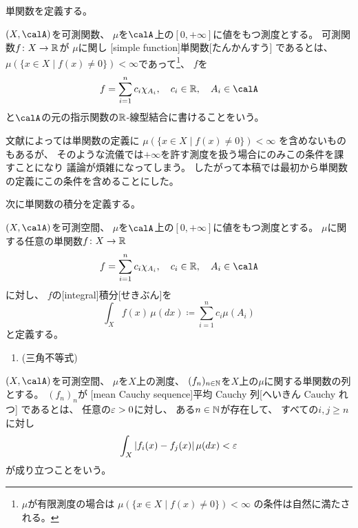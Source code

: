 \documentclass[report]{jlreq}
\begin{document}
単関数を定義する。

\begin{definition}[単関数]
    $(X, \calA)$を可測関数、
    $\mu$を$\calA$上の$[0, +\infty]$に値をもつ測度とする。
    可測関数$f \colon X \to \mathbb{R}$が
    $\mu$に関し
    [simple function]{単関数}[たんかんすう]
    であるとは、
    $\mu(\{ x \in X \mid f(x) \neq 0 \}) < \infty$であって\footnote{
        $\mu$が有限測度の場合は
        $\mu(\{ x \in X \mid f(x) \neq 0 \}) < \infty$
        の条件は自然に満たされる。
    }、
    $f$を
    \begin{equation}
        f = \sum_{i = 1}^n c_i \chi_{A_i},
            \quad
            c_i \in \R,
            \quad
            A_i \in \calA
    \end{equation}
    と$\calA$の元の指示関数の$\mathbb{R}$-線型結合に書けることをいう。
\end{definition}

文献によっては単関数の定義に
$\mu(\{ x \in X \mid f(x) \neq 0 \}) < \infty$
を含めないものもあるが、
そのような流儀では$+\infty$を許す測度を扱う場合にのみこの条件を課すことになり
議論が煩雑になってしまう。
したがって本稿では最初から単関数の定義にこの条件を含めることにした。

次に単関数の積分を定義する。

\begin{definition}[単関数の積分]
    $(X, \calA)$を可測空間、
    $\mu$を$\calA$上の$[0, +\infty]$に値をもつ測度とする。
    $\mu$に関する任意の単関数$f \colon X \to \mathbb{R}$
    \begin{equation}
        f = \sum_{i = 1}^n c_i \chi_{A_i},
            \quad
            c_i \in \R,
            \quad
            A_i \in \calA
    \end{equation}
    に対し、
    $f$の[integral]{積分}[せきぶん]を
    \begin{equation}
        \int_X f(x) \, \mu(dx)
            \coloneqq \sum_{i = 1}^n c_i \mu(A_i)
    \end{equation}
    と定義する。
\end{definition}

\begin{proposition}[単関数の積分の基本性質]
    \begin{enumerate}
        \item (三角不等式)
    \end{enumerate}
    \TODO{}
\end{proposition}

\begin{definition}
    $(X, \calA)$を可測空間、
    $\mu$を$X$上の測度、
    $(f_n)_{n \in \mathbb{N}}$を$X$上の$\mu$に関する単関数の列とする。
    $(f_n)_n$が
    [mean Cauchy sequence]{平均 Cauchy 列}[へいきん Cauchy れつ]
    であるとは、
    任意の$\varepsilon > 0$に対し、
    ある$n \in \mathbb{N}$が存在して、
    すべての$i, j \ge n$に対し
    \begin{equation}
        \int_X |f_i(x) - f_j(x)| \, \mu(dx) < \varepsilon
    \end{equation}
    が成り立つことをいう。
\end{definition}
\end{document}
